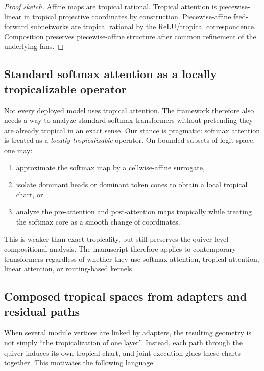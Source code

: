 \documentclass[11pt]{article}
\theoremstyle{definition}
\theoremstyle{plain}
\theoremstyle{remark}
\begin{document}
\begin{proof}[Proof sketch]
Affine maps are tropical rational.
Tropical attention is piecewise-linear in tropical projective coordinates by construction.
Piecewise-affine feed-forward subnetworks are tropical rational by the ReLU/tropical correspondence.
Composition preserves piecewise-affine structure after common refinement of the underlying fans.
\end{proof}

\subsection{Standard softmax attention as a locally tropicalizable operator}
\label{sec:softmax-local-tropical}

Not every deployed model uses tropical attention.
The framework therefore also needs a way to analyze standard softmax transformers without pretending they are already tropical in an exact sense.
Our stance is pragmatic:
softmax attention is treated as a \emph{locally tropicalizable} operator.
On bounded subsets of logit space, one may:
\begin{enumerate}[leftmargin=2em]
\item approximate the softmax map by a cellwise-affine surrogate,
\item isolate dominant heads or dominant token cones to obtain a local tropical chart, or
\item analyze the pre-attention and post-attention maps tropically while treating the softmax core as a smooth change of coordinates.
\end{enumerate}
This is weaker than exact tropicality, but still preserves the quiver-level compositional analysis.
The manuscript therefore applies to contemporary transformers regardless of whether they use softmax attention, tropical attention, linear attention, or routing-based kernels.

\subsection{Composed tropical spaces from adapters and residual paths}
\label{sec:composed-tropical-spaces}

When several module vertices are linked by adapters, the resulting geometry is not simply ``the tropicalization of one layer''.
Instead, each path through the quiver induces its own tropical chart, and joint execution glues these charts together.
This motivates the following language.
\end{document}
